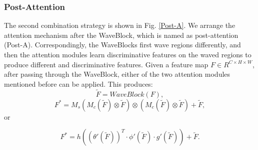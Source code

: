 \documentclass[journal]{IEEEtran}
\begin{document}
\subsubsection{Post-Attention}
The second combination strategy is shown in Fig. \ref{Post-A}. We arrange the attention mechanism after the WaveBlock, which is named as post-attention (Post-A). Correspondingly, the WaveBlocks first wave regions differently, and then the attention modules learn discriminative features on the waved regions to produce different and discriminative features. Given a feature map $F \in {R^{ C \times H \times W}}$, after passing through the WaveBlock, either of the two attention modules mentioned before can be applied. This produces:
\begin{equation} 
\widetilde F = WaveBlock\left( F \right),
\end{equation}
\begin{equation} 
{F^ * } = {M_s}\left( {{M_c}\left( {\widetilde F} \right) \otimes \widetilde F} \right) \otimes \left( {{M_c}\left( {\widetilde F} \right) \otimes \widetilde F} \right) + {\widetilde F},
\end{equation}
or

\begin{equation}
F^* = h\left( {{{\left( {\theta '\left( {{\widetilde F}} \right)} \right)}^T} \cdot \phi '\left( {{\widetilde F}} \right) \cdot g'\left( {{\widetilde F}} \right)} \right) + {\widetilde F}.
\end{equation}
 
\end{document}

